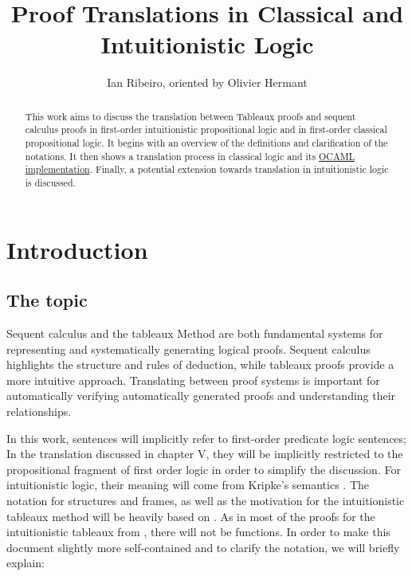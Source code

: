 \documentclass[runningheads]{llncs}
\begin{document}
%
\title{Proof Translations in Classical and Intuitionistic Logic}
%
%
\author{Ian Ribeiro, oriented by Olivier Hermant}
%

%
%
\maketitle              %
%
\begin{abstract}
This work aims to discuss the translation between Tableaux proofs and sequent calculus proofs in first-order intuitionistic propositional logic and in first-order classical propositional logic.
It begins with an overview of the definitions and clarification of the notations.
It then shows a translation process in classical logic and its   \href{https://github.com/lontra-lontra/proof-translations/tree/main/PROJECT}{OCAML implementation}.
Finally, a potential extension towards translation in intuitionistic logic is discussed.
\end{abstract}
%
%
\section{Introduction}
\subsection{The topic}


Sequent calculus and the tableaux Method are both fundamental systems for representing and systematically generating logical proofs. 
Sequent calculus highlights the structure and rules of deduction, while tableaux proofs provide a more intuitive approach. 
Translating between proof systems is important for automatically verifying automatically generated proofs and understanding their relationships.

In this work, sentences will implicitly refer to first-order predicate logic sentences; In the translation discussed in chapter V, they 
will be implicitly restricted to the propositional fragment of first order logic in order to simplify the discussion. 
For intuitionistic logic, their meaning will come from Kripke's semantics \cite{kripke1965} . The notation for structures and frames, as well as the motivation for
the intuitionistic tableaux method will be heavily based on \cite{book1}. As in most of the proofs for the intuitionistic tableaux from \cite{book1}, there will not be functions.  
In order to make this document slightly more self-contained and to clarify the notation, we will briefly explain:
\end{document}
